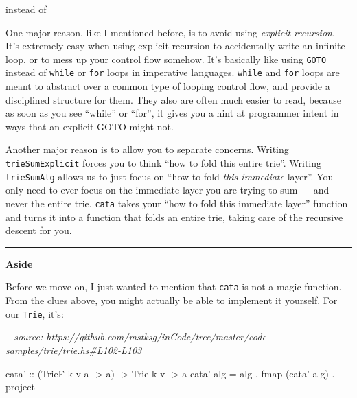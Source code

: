 \documentclass[]{article}
\newenvironment{Shaded}{}{}
\newcommand{\CommentTok}[1]{\textcolor[rgb]{0.38,0.63,0.69}{\textit{#1}}}
\newcommand{\DataTypeTok}[1]{\textcolor[rgb]{0.56,0.13,0.00}{#1}}
\newcommand{\DecValTok}[1]{\textcolor[rgb]{0.25,0.63,0.44}{#1}}
\newcommand{\FunctionTok}[1]{\textcolor[rgb]{0.02,0.16,0.49}{#1}}
\newcommand{\NormalTok}[1]{#1}
\newcommand{\OtherTok}[1]{\textcolor[rgb]{0.00,0.44,0.13}{#1}}
\begin{document}
instead of

\begin{Shaded}
\end{Shaded}

One major reason, like I mentioned before, is to avoid using \emph{explicit
recursion}. It's extremely easy when using explicit recursion to accidentally
write an infinite loop, or to mess up your control flow somehow. It's basically
like using \texttt{GOTO} instead of \texttt{while} or \texttt{for} loops in
imperative languages. \texttt{while} and \texttt{for} loops are meant to
abstract over a common type of looping control flow, and provide a disciplined
structure for them. They also are often much easier to read, because as soon as
you see ``while'' or ``for'', it gives you a hint at programmer intent in ways
that an explicit GOTO might not.

Another major reason is to allow you to separate concerns. Writing
\texttt{trieSumExplicit} forces you to think ``how to fold this entire trie''.
Writing \texttt{trieSumAlg} allows us to just focus on ``how to fold \emph{this
immediate} layer''. You only need to ever focus on the immediate layer you are
trying to sum --- and never the entire trie. \texttt{cata} takes your ``how to
fold this immediate layer'' function and turns it into a function that folds an
entire trie, taking care of the recursive descent for you.

\begin{center}\rule{0.5\linewidth}{\linethickness}\end{center}

\textbf{Aside}

Before we move on, I just wanted to mention that \texttt{cata} is not a magic
function. From the clues above, you might actually be able to implement it
yourself. For our \texttt{Trie}, it's:

\begin{Shaded}
\begin{Highlighting}[]
\CommentTok{-- source: https://github.com/mstksg/inCode/tree/master/code-samples/trie/trie.hs#L102-L103}

\OtherTok{cata' ::}\NormalTok{ (}\DataTypeTok{TrieF}\NormalTok{ k v a }\OtherTok{->}\NormalTok{ a) }\OtherTok{->} \DataTypeTok{Trie}\NormalTok{ k v }\OtherTok{->}\NormalTok{ a}
\NormalTok{cata' alg }\FunctionTok{=}\NormalTok{ alg }\FunctionTok{.}\NormalTok{ fmap (cata' alg) }\FunctionTok{.}\NormalTok{ project}
\end{Highlighting}
\end{Shaded}
\end{document}
